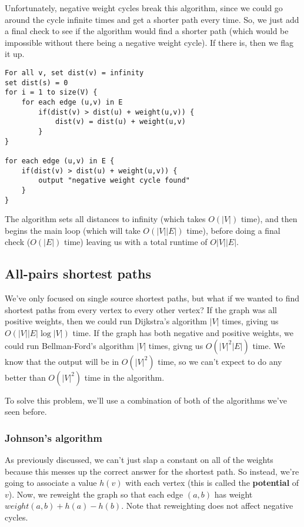 \documentclass[11pt,fleqn,a4paper,titlepage,dvipsnames,cmyk]{scrartcl}
\begin{document}
Unfortunately, negative weight cycles break this algorithm, since we could
go around the cycle infinite times and get a shorter path every time. So,
we just add a final check to see if the algorithm would find a shorter
path (which would be impossible without there being a negative weight
cycle). If there is, then we flag it up.

\begin{lstlisting}
For all v, set dist(v) = infinity
set dist(s) = 0
for i = 1 to size(V) {
    for each edge (u,v) in E
        if(dist(v) > dist(u) + weight(u,v)) {
            dist(v) = dist(u) + weight(u,v)
        }
}

for each edge (u,v) in E {
    if(dist(v) > dist(u) + weight(u,v)) {
        output "negative weight cycle found"
    }
}
\end{lstlisting}

The algorithm sets all distances to infinity (which takes $O(|V|)$ time),
and then begins the main loop (which will take $O(|V||E|)$ time), before
doing a final check ($O(|E|)$ time) leaving us with a total runtime of
$O|V||E|$.

\subsection{All-pairs shortest paths}%
\label{sub:All-pairs shortest paths}
We've only focused on single source shortest paths, but what if we wanted
to find shortest paths from every vertex to every other vertex? If the
graph was all positive weights, then we could run Dijkstra's algorithm
$|V|$ times, giving us $O(|V||E|\log |V|)$ time. If the graph has both
negative and positive weights, we could run Bellman-Ford's algorithm $|V|$
times, givng us $O(|V|^2|E|)$ time. We know that the output will be in
$O(|V|^2)$ time, so we can't expect to do any better than $O(|V|^2)$ time
in the algorithm.

To solve this problem, we'll use a combination of both of the algorithms
we've seen before.

\subsubsection{Johnson's algorithm}%
\label{ssub:Johnson's algorithm}
As previously discussed, we can't just slap a constant on all of the
weights because this messes up the correct answer for the shortest path.
So instead, we're going to associate a value $h(v)$ with each vertex (this
is called the \textbf{potential} of $v$). Now, we reweight the graph so
that each edge $(a,b)$ has weight $weight(a,b)+h(a) - h(b)$. Note that
reweighting does not affect negative cycles.
\end{document}
